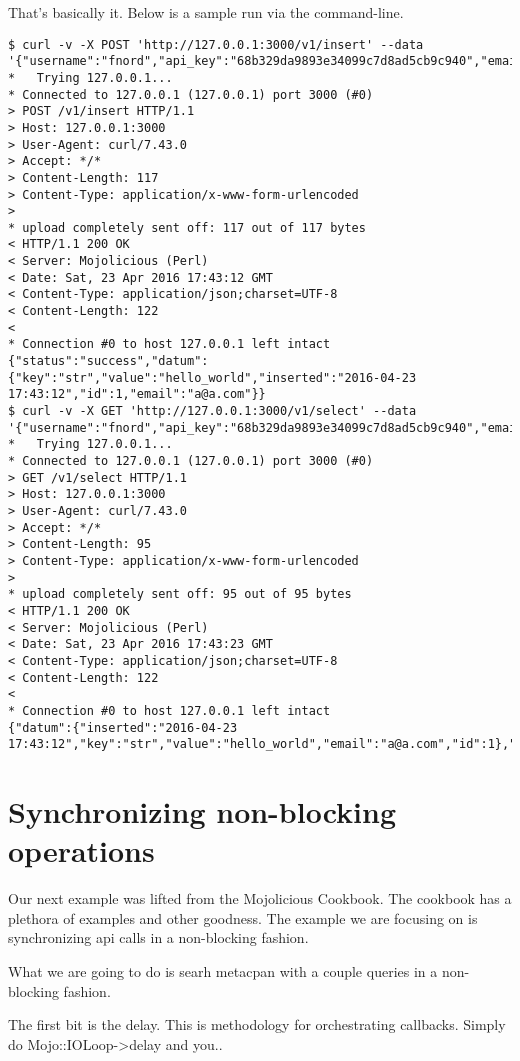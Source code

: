 \documentclass[14pt]{extreport}
\begin{document}
That's basically it.  Below is a sample run via the command-line.

\begin{lstlisting}[style=BashOutputStyle]
$ curl -v -X POST 'http://127.0.0.1:3000/v1/insert' --data '{"username":"fnord","api_key":"68b329da9893e34099c7d8ad5cb9c940","email":"a@a.com","key":"str","value":"hello_world"}'
*   Trying 127.0.0.1...
* Connected to 127.0.0.1 (127.0.0.1) port 3000 (#0)
> POST /v1/insert HTTP/1.1
> Host: 127.0.0.1:3000
> User-Agent: curl/7.43.0
> Accept: */*
> Content-Length: 117
> Content-Type: application/x-www-form-urlencoded
> 
* upload completely sent off: 117 out of 117 bytes
< HTTP/1.1 200 OK
< Server: Mojolicious (Perl)
< Date: Sat, 23 Apr 2016 17:43:12 GMT
< Content-Type: application/json;charset=UTF-8
< Content-Length: 122
< 
* Connection #0 to host 127.0.0.1 left intact
{"status":"success","datum":{"key":"str","value":"hello_world","inserted":"2016-04-23 17:43:12","id":1,"email":"a@a.com"}}
$ curl -v -X GET 'http://127.0.0.1:3000/v1/select' --data '{"username":"fnord","api_key":"68b329da9893e34099c7d8ad5cb9c940","email":"a@a.com","key":"str"}'
*   Trying 127.0.0.1...
* Connected to 127.0.0.1 (127.0.0.1) port 3000 (#0)
> GET /v1/select HTTP/1.1
> Host: 127.0.0.1:3000
> User-Agent: curl/7.43.0
> Accept: */*
> Content-Length: 95
> Content-Type: application/x-www-form-urlencoded
> 
* upload completely sent off: 95 out of 95 bytes
< HTTP/1.1 200 OK
< Server: Mojolicious (Perl)
< Date: Sat, 23 Apr 2016 17:43:23 GMT
< Content-Type: application/json;charset=UTF-8
< Content-Length: 122
< 
* Connection #0 to host 127.0.0.1 left intact
{"datum":{"inserted":"2016-04-23 17:43:12","key":"str","value":"hello_world","email":"a@a.com","id":1},"status":"success"}
\end{lstlisting}

\section{Synchronizing non-blocking operations}

Our next example was lifted from the Mojolicious Cookbook.  The cookbook has a
plethora of examples and other goodness.  The example we are focusing on is
synchronizing api calls in a non-blocking fashion.

What we are going to do is searh metacpan with a couple queries in a
non-blocking fashion.

The first bit is the delay.  This is methodology for orchestrating callbacks.  Simply do
Mojo::IOLoop->delay and you..
\end{document}
